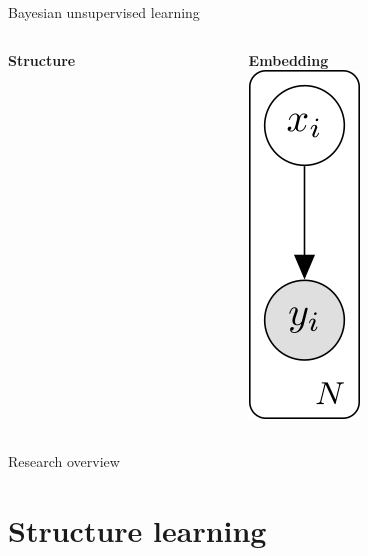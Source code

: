 \documentclass[10pt, compress]{beamer}
\begin{document}
\begin{frame}{Bayesian unsupervised learning}
  \centering
  \begin{columns}[T]
    \begin{column}{0.5\textwidth}
      \begin{overlayarea}{\textwidth}{7cm}
        \begin{center}
          \Large \textbf{Structure}\\ \vspace{10pt}
        \end{center}
      \end{overlayarea}
    \end{column}
    \begin{column}{0.5\textwidth}
      \begin{overlayarea}{\textwidth}{5cm}
        \centering
        \Large \textbf{Embedding} \\ \vspace{60pt}
        \includegraphics[]{img/bayesian-intro-right-1}
      \end{overlayarea}
    \end{column}
  \end{columns}
\end{frame}

\begin{frame}{Research overview}
  \centering
\end{frame}

\section{Structure learning}
\end{document}
